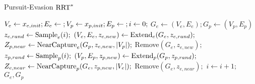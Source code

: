 \begin{algorithm}
\caption{Pursuit-Evasion $\textnormal{RRT}^*$ \cite{karaman}}\label{RRTpealg}
\begin{algorithmic}[1]
	\State $V_e \leftarrow {x_{e,init}}; E_e \leftarrow \null; V_p \leftarrow {x_{p,init}}; E_p \leftarrow \null; i \leftarrow 0;$
	 \do{}
		\State $G_e \leftarrow (V_e,E_e);G_p \leftarrow (V_p,E_p)$
		\State $z_{e,rand} \leftarrow \textnormal{Sample}_e(i);$
		\State $(V_e,E_e,z_{e,new}) \leftarrow \textnormal{Extend}_e(G_e,z_{e,rand});$
			\State $Z_{p,near} \leftarrow \textnormal{NearCapture}_e(G_p,z_{e,new},|V_p|);$
			 \do{}
					\State Remove$(G_e,z_{e,new});$
				\EndIf
			\EndFor
		\EndIf
		\State $z_{p,rand} \leftarrow \textnormal{Sample}_p(i);$
				\State $(V_p,E_p,z_{p,new}) \leftarrow \textnormal{Extend}_p(G_p,z_{p,rand});$
					\State $Z_{e,near} \leftarrow \textnormal{NearCapture}_p(G_e,z_{p,new},|V_e|);$
					 \do{}
							\State Remove$(G_e,z_{e,near});$
						\EndIf
					\EndFor
				\EndIf
		\State $i \leftarrow i +1;$
	\EndWhile
	\State
	\Return $G_e,G_p$
\end{algorithmic}
\end{algorithm}

